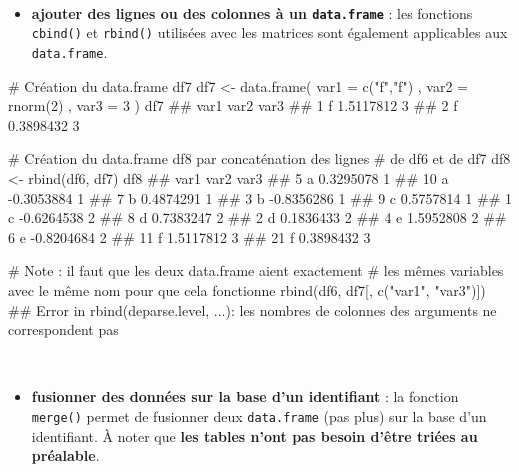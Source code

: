 \documentclass[12pt,twosided, notitlepage]{book}
\newenvironment{Shaded}{}{}
\newcommand{\KeywordTok}[1]{\textcolor[rgb]{0.00,0.00,1.00}{{#1}}}
\newcommand{\DataTypeTok}[1]{{#1}}
\newcommand{\DecValTok}[1]{{#1}}
\newcommand{\StringTok}[1]{\textcolor[rgb]{0.00,0.50,0.50}{{#1}}}
\newcommand{\CommentTok}[1]{\textcolor[rgb]{0.00,0.50,0.00}{{#1}}}
\newcommand{\NormalTok}[1]{{#1}}
\providecommand{\tightlist}{%
  \setlength{\itemsep}{0pt}\setlength{\parskip}{0pt}}
\renewenvironment{Shaded}{\begin{snugshade}}{\end{snugshade}}
\begin{document}
~

\begin{itemize}
\tightlist
\item
  \textbf{ajouter des lignes ou des colonnes à un \texttt{data.frame}} :
  les fonctions \texttt{cbind()} et
  \texttt{rbind()} utilisées avec les matrices
  sont également applicables aux \texttt{data.frame}.
\end{itemize}

\begin{Shaded}
\begin{Highlighting}[]
\CommentTok{# Création du data.frame df7}
\NormalTok{df7 <-}\StringTok{ }\KeywordTok{data.frame}\NormalTok{(}
  \DataTypeTok{var1 =} \KeywordTok{c}\NormalTok{(}\StringTok{"f"}\NormalTok{,}\StringTok{"f"}\NormalTok{)}
  \NormalTok{, }\DataTypeTok{var2 =} \KeywordTok{rnorm}\NormalTok{(}\DecValTok{2}\NormalTok{)}
  \NormalTok{, }\DataTypeTok{var3 =} \DecValTok{3}
\NormalTok{)}
\NormalTok{df7}
  \NormalTok{##   var1      var2 var3}
  \NormalTok{## 1    f 1.5117812    3}
  \NormalTok{## 2    f 0.3898432    3}

\CommentTok{# Création du data.frame df8 par concaténation des lignes }
\CommentTok{# de df6 et de df7}
\NormalTok{df8 <-}\StringTok{ }\KeywordTok{rbind}\NormalTok{(df6, df7)}
\NormalTok{df8}
  \NormalTok{##    var1       var2 var3}
  \NormalTok{## 5     a  0.3295078    1}
  \NormalTok{## 10    a -0.3053884    1}
  \NormalTok{## 7     b  0.4874291    1}
  \NormalTok{## 3     b -0.8356286    1}
  \NormalTok{## 9     c  0.5757814    1}
  \NormalTok{## 1     c -0.6264538    2}
  \NormalTok{## 8     d  0.7383247    2}
  \NormalTok{## 2     d  0.1836433    2}
  \NormalTok{## 4     e  1.5952808    2}
  \NormalTok{## 6     e -0.8204684    2}
  \NormalTok{## 11    f  1.5117812    3}
  \NormalTok{## 21    f  0.3898432    3}

\CommentTok{# Note : il faut que les deux data.frame aient exactement}
\CommentTok{# les mêmes variables avec le même nom pour que cela fonctionne}
\KeywordTok{rbind}\NormalTok{(df6, df7[, }\KeywordTok{c}\NormalTok{(}\StringTok{"var1"}\NormalTok{, }\StringTok{"var3"}\NormalTok{)])}
  \NormalTok{## Error in rbind(deparse.level, ...): les nombres de colonnes des arguments ne correspondent pas}
\end{Highlighting}
\end{Shaded}

~

\begin{itemize}
\tightlist
\item
  \textbf{fusionner des données sur la base d'un identifiant} : la
  fonction \texttt{merge()} permet de
  fusionner deux \texttt{data.frame} (pas plus) sur la base d'un
  identifiant. À noter que \textbf{les tables n'ont pas besoin d'être
  triées au préalable}.
\end{itemize}
\end{document}
